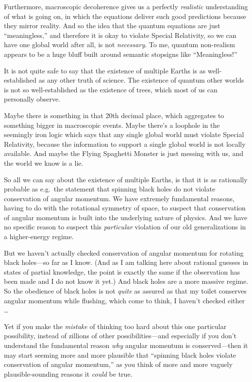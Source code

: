 {
 Furthermore, macroscopic decoherence gives us a perfectly
\textit{realistic} understanding of what is going on, in which the
equations deliver such good predictions because they mirror reality.
And so the idea that the quantum equations are just
``meaningless,'' and therefore it is
okay to violate Special Relativity, so we can have one global world
after all, is not \textit{necessary}. To me, quantum non-realism
appears to be a huge bluff built around semantic stopsigns like
``Meaningless!''}

{
 It is not quite safe to say that the existence of multiple Earths
is as well-established as any other truth of science. The existence of
quantum other worlds is not so well-established as the existence of
trees, which most of us can personally observe.}

{
 Maybe there is something in that 20th decimal place, which
aggregates to something bigger in macroscopic events. Maybe
there's a loophole in the seemingly iron logic which
says that any single global world must violate Special Relativity,
because the information to support a single global world is not locally
available. And maybe the Flying Spaghetti Monster is just messing with
us, and the world we know is a lie.}

{
 So all we can say about the existence of multiple Earths, is that
it is as rationally probable as e.g.~the statement that spinning black
holes do not violate conservation of angular momentum. We have
extremely fundamental reasons, having to do with the rotational
symmetry of space, to suspect that conservation of angular momentum is
built into the underlying nature of physics. And we have no specific
reason to suspect this \textit{particular} violation of our old
generalizations in a higher-energy regime.}

{
 But we haven't actually checked conservation of
angular momentum for rotating black holes---so far as I know. (And as I
am talking here about rational guesses in states of partial knowledge,
the point is exactly the same if the observation has been made and I do
not know it yet.) And black holes are a more massive regime. So the
obedience of black holes is not \textit{quite} as assured as that my
toilet conserves angular momentum while flushing, which come to think,
I haven't checked either \ldots}

{
 Yet if you make the \textit{mistake} of thinking too hard about
this one particular possibility, instead of zillions of other
possibilities---and especially if you don't understand
the fundamental reason \textit{why} angular momentum is
conserved---then it may start seeming more and more plausible that
``spinning black holes violate conservation of angular
momentum,'' as you think of more and more vaguely
plausible-sounding reasons it \textit{could} be true.}

